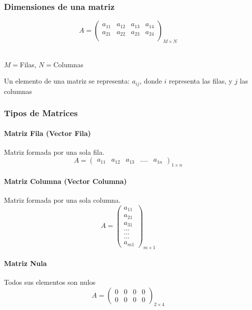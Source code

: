 \documentclass[stu, 12pt, a4paper, donotrepeattitle, floatsintext, natbib]{apa7}
\begin{document}
    \subsubsection{Dimensiones de una matriz}
    \[
        A=\begin{pmatrix}
              a_{11} & a_{12} & a_{13} & a_{14} \\
              a_{21} & a_{22} & a_{23} & a_{24} \\
        \end{pmatrix}_{M\times N}
    \]\\
    \begin{small}
        \begin{center}
            $M= $Filas, $N= $Columnas
        \end{center}
    \end{small}

    Un elemento de una matriz se representa: {\Large $a_{ij}$}, donde {\Large $i$} representa las filas, y {\Large $j$} las columnas\\

    \subsubsection{Tipos de Matrices}

    \paragraph{Matriz Fila (Vector Fila)}
    Matriz formada por una sola fila.
    \[A=\begin{pmatrix}
            a_{11} & a_{12} & a_{13} & .... & a_{1n}
    \end{pmatrix}_{1\times n}\]

    \paragraph{Matriz Columna (Vector Columna)}
    Matriz formada por una sola columna.
    \[A=\begin{pmatrix}
            a_{11} \\ a_{21} \\ a_{31} \\ \dots \\ \dots \\ \dots \\ a_{m1}
    \end{pmatrix}_{m\times1}\]

    \paragraph{Matriz Nula}
    Todos sus elementos son nulos
    \[A=\begin{pmatrix}
            0 & 0 & 0 & 0 \\ 0 & 0 & 0 & 0
    \end{pmatrix}_{2\times4}\]
\end{document}
